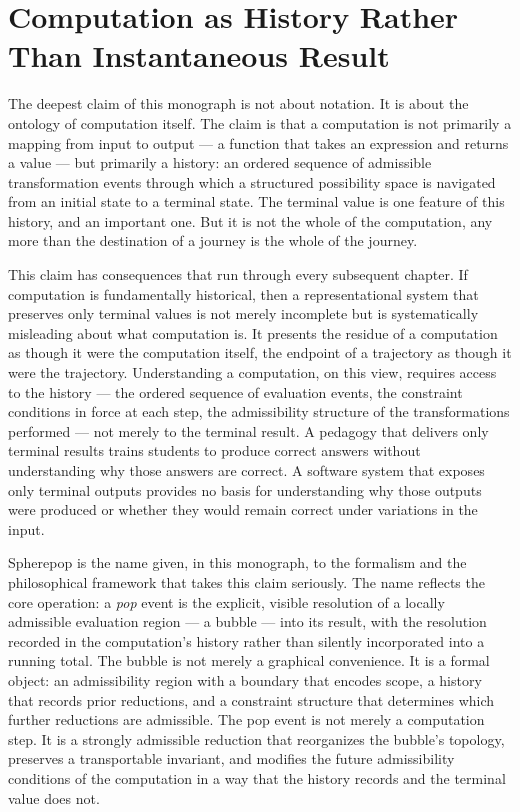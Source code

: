 \documentclass[12pt,openany]{book}
\theoremstyle{plain}
\theoremstyle{definition}
\theoremstyle{remark}
\begin{document}
\section*{Computation as History Rather Than Instantaneous Result}

The deepest claim of this monograph is not about notation. It is about the ontology of computation itself. The claim is that a computation is not primarily a mapping from input to output — a function that takes an expression and returns a value — but primarily a history: an ordered sequence of admissible transformation events through which a structured possibility space is navigated from an initial state to a terminal state. The terminal value is one feature of this history, and an important one. But it is not the whole of the computation, any more than the destination of a journey is the whole of the journey.

This claim has consequences that run through every subsequent chapter. If computation is fundamentally historical, then a representational system that preserves only terminal values is not merely incomplete but is systematically misleading about what computation is. It presents the residue of a computation as though it were the computation itself, the endpoint of a trajectory as though it were the trajectory. Understanding a computation, on this view, requires access to the history — the ordered sequence of evaluation events, the constraint conditions in force at each step, the admissibility structure of the transformations performed — not merely to the terminal result. A pedagogy that delivers only terminal results trains students to produce correct answers without understanding why those answers are correct. A software system that exposes only terminal outputs provides no basis for understanding why those outputs were produced or whether they would remain correct under variations in the input.

Spherepop is the name given, in this monograph, to the formalism and the philosophical framework that takes this claim seriously. The name reflects the core operation: a \emph{pop} event is the explicit, visible resolution of a locally admissible evaluation region — a bubble — into its result, with the resolution recorded in the computation's history rather than silently incorporated into a running total. The bubble is not merely a graphical convenience. It is a formal object: an admissibility region with a boundary that encodes scope, a history that records prior reductions, and a constraint structure that determines which further reductions are admissible. The pop event is not merely a computation step. It is a strongly admissible reduction that reorganizes the bubble's topology, preserves a transportable invariant, and modifies the future admissibility conditions of the computation in a way that the history records and the terminal value does not.
\end{document}

